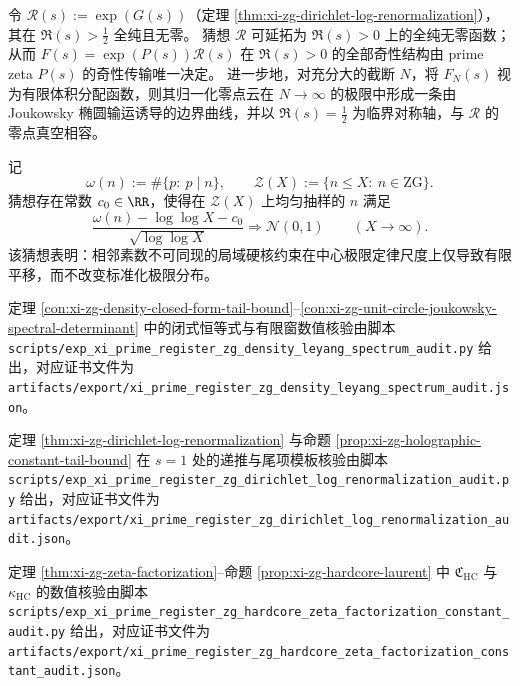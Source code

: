 \begin{conjecture}\label{conj:xi-zg-leyang-godel-transport-boundary}
令 \(\mathcal R(s):=\exp(G(s))\)（定理 \ref{thm:xi-zg-dirichlet-log-renormalization}），其在 \(\Re(s)>\tfrac12\) 全纯且无零。
猜想 \(\mathcal R\) 可延拓为 \(\Re(s)>0\) 上的全纯无零函数；从而 \(F(s)=\exp(P(s))\mathcal R(s)\) 在 \(\Re(s)>0\) 的全部奇性结构由 prime zeta \(P(s)\) 的奇性传输唯一决定。
进一步地，对充分大的截断 \(N\)，将 \(F_N(s)\) 视为有限体积分配函数，则其归一化零点云在 \(N\to\infty\) 的极限中形成一条由 Joukowsky 椭圆输运诱导的边界曲线，并以 \(\Re(s)=\tfrac12\) 为临界对称轴，与 \(\mathcal R\) 的零点真空相容。
\end{conjecture}

\begin{conjecture}\label{conj:xi-zg-erdos-kac-under-local-hardcore}
记
\[
\omega(n):=\#\{p:\ p\mid n\},
\qquad
\mathcal Z(X):=\{n\le X:\ n\in\mathrm{ZG}\}.
\]
猜想存在常数 \(c_0\in\RR\)，使得在 \(\mathcal Z(X)\) 上均匀抽样的 \(n\) 满足
\[
\frac{\omega(n)-\log\log X-c_0}{\sqrt{\log\log X}}
\Longrightarrow
\mathcal N(0,1)
\qquad(X\to\infty).
\]
该猜想表明：相邻素数不可同现的局域硬核约束在中心极限定律尺度上仅导致有限平移，而不改变标准化极限分布。
\end{conjecture}

\begin{remark}[可复现核验脚本]\label{rem:xi-zg-density-leyang-spectral-audit-script}
定理 \ref{con:xi-zg-density-closed-form-tail-bound}--\ref{con:xi-zg-unit-circle-joukowsky-spectral-determinant}
中的闭式恒等式与有限窗数值核验由脚本
\texttt{scripts/exp\_xi\_prime\_register\_zg\_density\_leyang\_spectrum\_audit.py}
给出，对应证书文件为
\texttt{artifacts/export/xi\_prime\_register\_zg\_density\_leyang\_spectrum\_audit.json}。
\par
定理 \ref{thm:xi-zg-dirichlet-log-renormalization} 与命题 \ref{prop:xi-zg-holographic-constant-tail-bound}
在 \(s=1\) 处的递推与尾项模板核验由脚本
\texttt{scripts/exp\_xi\_prime\_register\_zg\_dirichlet\_log\_renormalization\_audit.py}
给出，对应证书文件为
\texttt{artifacts/export/xi\_prime\_register\_zg\_dirichlet\_log\_renormalization\_audit.json}。
\par
定理 \ref{thm:xi-zg-zeta-factorization}--命题 \ref{prop:xi-zg-hardcore-laurent}
中 \(\mathfrak C_{\mathrm{HC}}\) 与 \(\kappa_{\mathrm{HC}}\) 的数值核验由脚本
\texttt{scripts/exp\_xi\_prime\_register\_zg\_hardcore\_zeta\_factorization\_constant\_audit.py}
给出，对应证书文件为
\texttt{artifacts/export/xi\_prime\_register\_zg\_hardcore\_zeta\_factorization\_constant\_audit.json}。
\end{remark}
